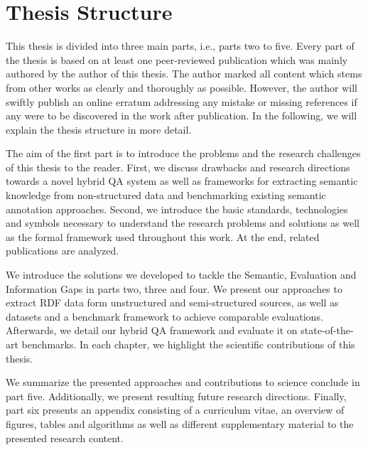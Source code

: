 \section*{Thesis Structure}

This thesis is divided into three main parts, i.e., parts two to five.
Every part of the thesis is based on at least one peer-reviewed publication which was mainly authored by the author of this thesis.
The author marked all content which stems from other works as clearly and thoroughly as possible. 
However, the author will swiftly publish an online erratum addressing any mistake or missing references if any were to be discovered in the work after publication.
In the following, we will explain the thesis structure in more detail.

The aim of the first part is to introduce the problems and the research challenges of this thesis to the reader. 
First, we discuss drawbacks and research directions towards a novel hybrid \ac{QA} system as well as frameworks for extracting semantic knowledge from non-structured data and benchmarking existing semantic annotation approaches.
Second, we introduce the basic standards, technologies and symbols necessary to understand the research problems and solutions as well as the formal framework used throughout this work.
At the end, related publications are analyzed.

We introduce the solutions we developed to tackle the Semantic, Evaluation and Information Gaps in parts two, three and four.  
We  present our approaches to extract \ac{RDF} data form unstructured and semi-structured sources, as well as datasets and a benchmark framework to achieve comparable evaluations. 
Afterwards, we detail our hybrid \ac{QA} framework and evaluate it on state-of-the-art benchmarks.
In each chapter, we highlight the scientific contributions of this thesis.

We  summarize the presented approaches and contributions to science conclude in part five. 
Additionally, we present resulting future research directions.
Finally, part six presents an appendix consisting of a curriculum vitae, an overview of figures, tables and algorithms as well as different supplementary material to the presented research content.